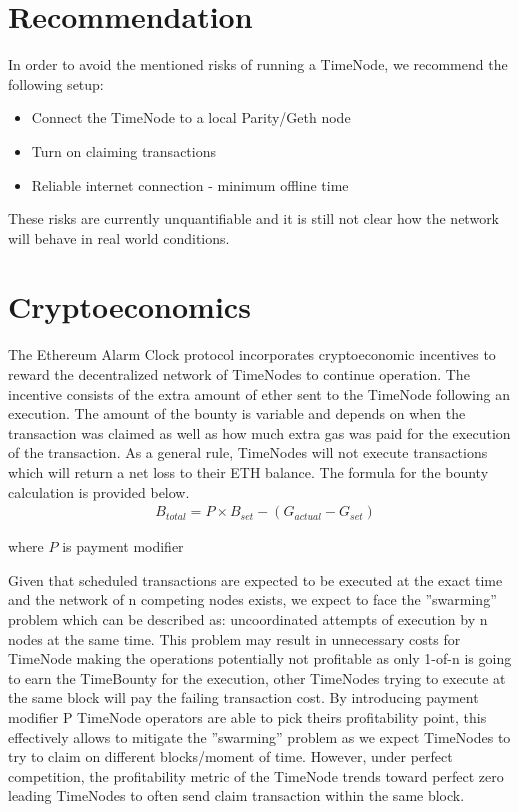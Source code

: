 \documentclass{report}
\begin{document}
  \section{Recommendation}
  In order to avoid the mentioned risks of running a TimeNode, we recommend the following setup:
  \begin{itemize}
    \item Connect the TimeNode to a local Parity/Geth node
    \item Turn on claiming transactions
    \item Reliable internet connection - minimum offline time
  \end{itemize}

  These risks are currently unquantifiable and it is still not clear how the network will behave in real world conditions.

  \section{Cryptoeconomics}
  The Ethereum Alarm Clock protocol incorporates cryptoeconomic incentives to reward the decentralized network of TimeNodes to continue operation. The incentive consists of the extra amount of ether sent to the TimeNode following an execution. The amount of the bounty is variable and depends on when the transaction was claimed as well as how much extra gas was paid for the execution of the transaction. As a general rule, TimeNodes will not execute transactions which will return a net loss to their ETH balance. The formula for the bounty calculation is provided below.
  \begin{align*}
    &B_{total} = P \times B_{set} - (G_{actual} - G_{set})
  \end{align*}

  where $P$ is payment modifier
 
  Given that scheduled transactions are expected to be executed at the exact time and the network of n competing nodes exists, we expect to face the ”swarming” problem which can be described as: uncoordinated attempts of execution by n nodes at the same time. This problem may result in unnecessary costs for TimeNode making the operations potentially not profitable as only 1-of-n is going to earn the TimeBounty for the execution, other TimeNodes trying to execute at the same block will pay the failing transaction cost. By introducing payment modifier P TimeNode operators are able to pick theirs profitability point, this effectively allows to mitigate the ”swarming” problem as we expect TimeNodes to try to claim on different blocks/moment of time. However, under perfect competition, the profitability metric of the TimeNode trends toward perfect zero leading TimeNodes to often send claim transaction within the same block.
\end{document}
